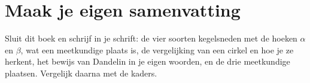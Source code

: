 \begin{oefeningen}





\end{oefeningen}


\ifzelfstudie
\section*{Maak je eigen samenvatting}
Sluit dit boek en schrijf in je schrift: de vier soorten kegelsneden met de hoeken $\alpha$ en $\beta$, wat een meetkundige plaats is, de vergelijking van een cirkel en hoe je ze herkent, het bewijs van Dandelin in je eigen woorden, en de drie meetkundige plaatsen. Vergelijk daarna met de kaders.
\fi
